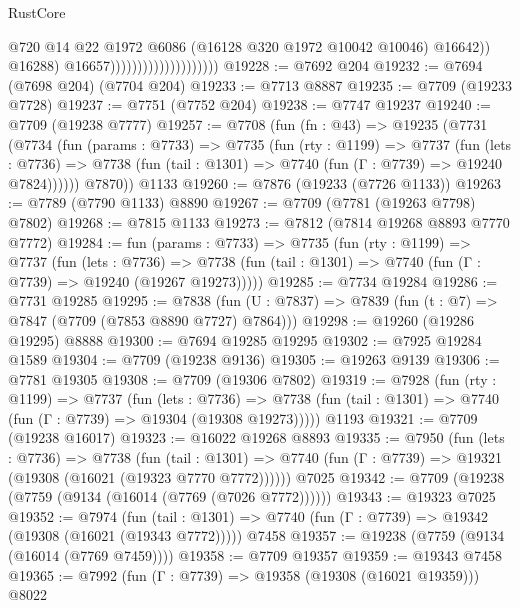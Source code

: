 \begin{lexlean}{RustCore}
\begin{coremodule}
                                                  @720
                                                  @14
                                                  @22
                                                  @1972
                                                  @6086
                                                  (@16128 @320 @1972 @10042 @10046)
                                                  @16642))
                                              @16288)
                                            @16657))))))))))))))))))))
@19228 := @7692 @204
@19232 := @7694 (@7698 @204) (@7704 @204)
@19233 := @7713 @8887
@19235 := @7709 (@19233 @7728)
@19237 := @7751 (@7752 @204)
@19238 := @7747 @19237
@19240 := @7709 (@19238 @7777)
@19257 := @7708
    (fun (fn : @43) =>
    @19235
      (@7731
        (@7734
          (fun (params : @7733) =>
          @7735
            (fun (rty : @1199) =>
            @7737
              (fun (lets : @7736) =>
              @7738 (fun (tail : @1301) => @7740 (fun (Γ : @7739) => @19240 @7824))))))
        @7870))
    @1133
@19260 := @7876 (@19233 (@7726 @1133))
@19263 := @7789 (@7790 @1133) @8890
@19267 := @7709 (@7781 (@19263 @7798) @7802)
@19268 := @7815 @1133
@19273 := @7812 (@7814 @19268 @8893 @7770 @7772)
@19284 := fun (params : @7733) =>
  @7735
    (fun (rty : @1199) =>
    @7737
      (fun (lets : @7736) =>
      @7738 (fun (tail : @1301) => @7740 (fun (Γ : @7739) => @19240 (@19267 @19273)))))
@19285 := @7734 @19284
@19286 := @7731 @19285
@19295 := @7838 (fun (U : @7837) => @7839 (fun (t : @7) => @7847 (@7709 (@7853 @8890 @7727) @7864)))
@19298 := @19260 (@19286 @19295) @8888
@19300 := @7694 @19285 @19295
@19302 := @7925 @19284 @1589
@19304 := @7709 (@19238 @9136)
@19305 := @19263 @9139
@19306 := @7781 @19305
@19308 := @7709 (@19306 @7802)
@19319 := @7928
    (fun (rty : @1199) =>
    @7737
      (fun (lets : @7736) =>
      @7738 (fun (tail : @1301) => @7740 (fun (Γ : @7739) => @19304 (@19308 @19273)))))
    @1193
@19321 := @7709 (@19238 @16017)
@19323 := @16022 @19268 @8893
@19335 := @7950
    (fun (lets : @7736) =>
    @7738
      (fun (tail : @1301) =>
      @7740 (fun (Γ : @7739) => @19321 (@19308 (@16021 (@19323 @7770 @7772))))))
    @7025
@19342 := @7709 (@19238 (@7759 (@9134 (@16014 (@7769 (@7026 @7772))))))
@19343 := @19323 @7025
@19352 := @7974
    (fun (tail : @1301) => @7740 (fun (Γ : @7739) => @19342 (@19308 (@16021 (@19343 @7772)))))
    @7458
@19357 := @19238 (@7759 (@9134 (@16014 (@7769 @7459))))
@19358 := @7709 @19357
@19359 := @19343 @7458
@19365 := @7992 (fun (Γ : @7739) => @19358 (@19308 (@16021 @19359))) @8022

\end{coremodule}
\end{lexlean}
